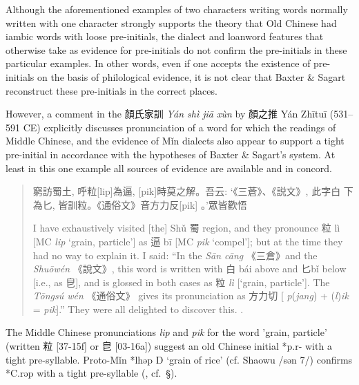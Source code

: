 Although the aforementioned examples of two characters writing words
normally written with one character strongly supports the theory that
Old Chinese had iambic words with loose pre-initials, the dialect and
loanword features that 
\citet[]{Baxter2014OldChinese}
otherwise take as
evidence for pre-initials do not confirm the pre-initials in these
particular examples. In other words, even if one accepts the existence
of pre-initials on the basis of philological evidence, it is not clear
that Baxter \& Sagart reconstruct these pre-initials in the correct
places.

However, a comment in the 顏氏家訓  \emph{Yán shì jiā xùn} by 顏之推 Yán
Zhītuī (531--591 CE) explicitly discusses pronunciation of a word for
which the readings of Middle Chinese, and the evidence of Mǐn dialects
also appear to support a tight pre-initial in accordance with the
hypotheses of Baxter \& Sagart's system. At least in this one example
all sources of evidence are available and in concord.

\begin{quote}
窮訪蜀土, 呼粒{[}lip]為逼, {[}pik]時莫之解。吾云:
`《三蒼》、《説文》, 此字白 下為匕, 皆訓粒。《通俗文》音方力反{[}pik]
。'眾皆歡悟

I have exhaustively visited {[}the] Shǔ 蜀 region, and they pronounce
粒 lì {[}MC \emph{lip} `grain, particle'] as 逼 bī {[}MC \emph{pik}
`compel']; but at the time they had no way to explain it. I said: ``In
the \emph{Sān cāng} 《三倉》and the \emph{Shuōwén} 《說文》, this word
is written with 白 bái above and 匕bǐ below {[}i.e., as 皀], and is
glossed in both cases as 粒 \emph{lì }{[}`grain, particle']. The
 \emph{Tōngsú wén} 《通俗文》 gives its pronunciation as 方力切
{[} \emph{p}(\emph{jang}) + (\emph{l})\emph{ik} = \emph{pik}].'' They
were all delighted to discover this. 
\citep[307 and 406 note 113]{Baxter2014OldChinese}.
\end{quote}

The Middle Chinese pronunciations \emph{lip} and \emph{pik} for the word
'grain, particle' (written 粒 {[}37-15f] or 皀 {[}03-16a]) suggest
an old Chinese initial *p.r- with a tight pre-syllable. Proto-Mǐn *lhəp
D `grain of rice' (cf. Shaowu /sən 7/) confirms *C.rəp with a tight
pre-syllable (\cite[307]{Baxter2014OldChinese}, cf.~§).

